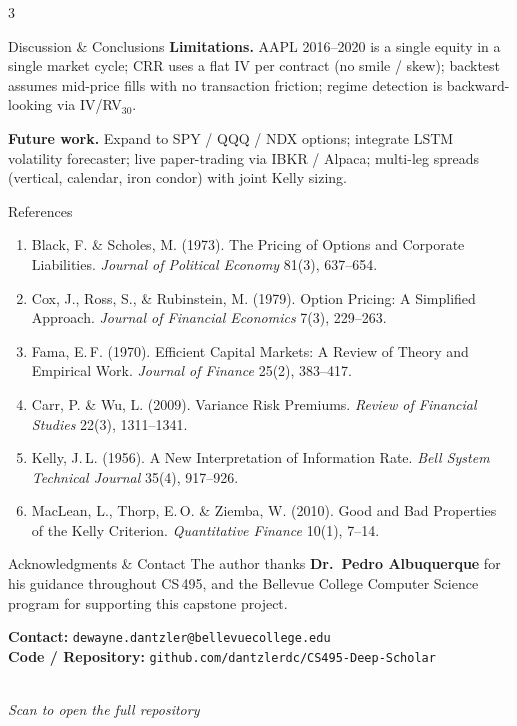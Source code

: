 \documentclass[a0,portrait]{a0poster}
\begin{document}
\begin{multicols}{3}
\begin{posterblock}{Discussion \& Conclusions}
\vspace{0.3em}
\textbf{Limitations.} AAPL 2016--2020 is a single equity in a single
market cycle; CRR uses a flat IV per contract (no smile / skew);
backtest assumes mid-price fills with no transaction friction; regime
detection is backward-looking via IV/RV$_{30}$.

\vspace{0.3em}
\textbf{Future work.} Expand to SPY / QQQ / NDX options; integrate
LSTM volatility forecaster; live paper-trading via IBKR / Alpaca;
multi-leg spreads (vertical, calendar, iron condor) with joint Kelly
sizing.
\end{posterblock}

\begin{posterblock}{References}
\normalsize
\begin{enumerate}[leftmargin=1.6em,itemsep=4pt,topsep=4pt]
  \item Black, F. \& Scholes, M. (1973). The Pricing of Options and
        Corporate Liabilities. \emph{Journal of Political Economy} 81(3),
        637--654.
  \item Cox, J., Ross, S., \& Rubinstein, M. (1979). Option Pricing:
        A Simplified Approach. \emph{Journal of Financial Economics} 7(3),
        229--263.
  \item Fama, E.\,F. (1970). Efficient Capital Markets: A Review of
        Theory and Empirical Work. \emph{Journal of Finance} 25(2),
        383--417.
  \item Carr, P. \& Wu, L. (2009). Variance Risk Premiums.
        \emph{Review of Financial Studies} 22(3), 1311--1341.
  \item Kelly, J.\,L. (1956). A New Interpretation of Information Rate.
        \emph{Bell System Technical Journal} 35(4), 917--926.
  \item MacLean, L., Thorp, E.\,O. \& Ziemba, W. (2010). Good and Bad
        Properties of the Kelly Criterion. \emph{Quantitative Finance}
        10(1), 7--14.
\end{enumerate}
\end{posterblock}

\begin{posterblock}{Acknowledgments \& Contact}
The author thanks \textbf{Dr.~Pedro Albuquerque} for his guidance
throughout CS\,495, and the Bellevue College Computer Science program
for supporting this capstone project.

\vspace{0.6em}
\textbf{Contact:} \texttt{dewayne.dantzler@bellevuecollege.edu}\\
\textbf{Code / Repository:}
\texttt{github.com/dantzlerdc/CS495-Deep-Scholar}

\vspace{0.5em}
\begin{center}
\\[0.3em]
\small\textit{Scan to open the full repository}
\end{center}
\end{posterblock}

\end{multicols}
\end{document}
